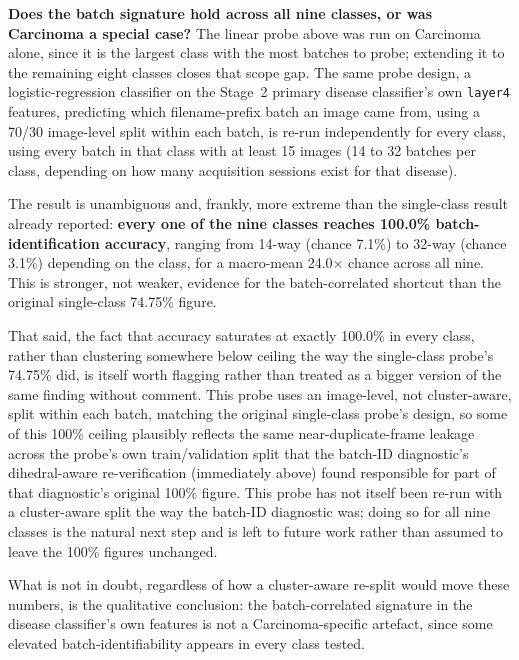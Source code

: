 \textbf{Does the batch signature hold across all nine classes, or was Carcinoma a special case?} The linear probe above was run on Carcinoma alone, since it is the largest class with the most batches to probe; extending it to the remaining eight classes closes that scope gap. The same probe design, a logistic-regression classifier on the Stage~2 primary disease classifier's own \texttt{layer4} features, predicting which filename-prefix batch an image came from, using a 70/30 image-level split within each batch, is re-run independently for every class, using every batch in that class with at least 15 images (14 to 32 batches per class, depending on how many acquisition sessions exist for that disease).

The result is unambiguous and, frankly, more extreme than the single-class result already reported: \textbf{every one of the nine classes reaches 100.0\% batch-identification accuracy}, ranging from 14-way (chance 7.1\%) to 32-way (chance 3.1\%) depending on the class, for a macro-mean 24.0$\times$ chance across all nine. This is stronger, not weaker, evidence for the batch-correlated shortcut than the original single-class 74.75\% figure.

That said, the fact that accuracy saturates at exactly 100.0\% in every class, rather than clustering somewhere below ceiling the way the single-class probe's 74.75\% did, is itself worth flagging rather than treated as a bigger version of the same finding without comment. This probe uses an image-level, not cluster-aware, split within each batch, matching the original single-class probe's design, so some of this 100\% ceiling plausibly reflects the same near-duplicate-frame leakage across the probe's own train/validation split that the batch-ID diagnostic's dihedral-aware re-verification (immediately above) found responsible for part of that diagnostic's original 100\% figure. This probe has not itself been re-run with a cluster-aware split the way the batch-ID diagnostic was; doing so for all nine classes is the natural next step and is left to future work rather than assumed to leave the 100\% figures unchanged.

What is not in doubt, regardless of how a cluster-aware re-split would move these numbers, is the qualitative conclusion: the batch-correlated signature in the disease classifier's own features is not a Carcinoma-specific artefact, since some elevated batch-identifiability appears in every class tested.

